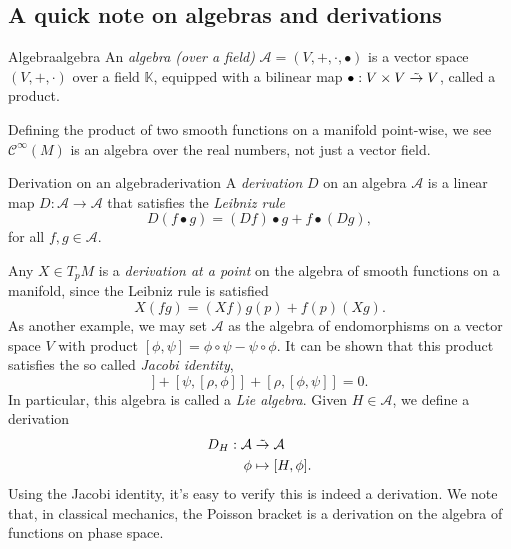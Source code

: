 \subsection{A quick note on algebras and derivations}
\begin{definition}{Algebra}{algebra}
    An \emph{algebra (over a field)} \(\mathcal{A} = (V, +, \cdot, \bullet)\) is a vector space \((V, +, \cdot)\) over a field \(\mathbb{K}\), equipped with a bilinear map \(\bullet : V \times V \mathrel{\tilde{\to}} V\), called a product.
\end{definition}
Defining the product of two smooth functions on a manifold point-wise, we see \(\mathcal{C}^\infty(M)\) is an algebra over the real numbers, not just a vector field.

\begin{definition}{Derivation on an algebra}{derivation}
    A \emph{derivation} \(D\) on an algebra \(\mathcal{A}\) is a linear map \(D : \mathcal{A} \to \mathcal{A}\) that satisfies the \emph{Leibniz rule}
    \begin{equation*}
        D(f\bullet g) = (Df) \bullet g + f \bullet (Dg),
    \end{equation*}
    for all \(f,g \in \mathcal{A}.\)
\end{definition}
Any \(X \in T_pM\) is a \emph{derivation at a point} on the algebra of smooth functions on a manifold, since the Leibniz rule is satisfied
\begin{equation*}
    X(fg) = (Xf)g(p) + f(p)(Xg).
\end{equation*}
As another example, we may set \(\mathcal{A}\) as the algebra of endomorphisms on a vector space \(V\) with product \([\phi, \psi] = \phi \circ \psi - \psi \circ \phi\). It can be shown that this product satisfies the so called \emph{Jacobi identity},
\begin{equation*}
    [\phi, [\psi, \rho]] + [\psi, [\rho, \phi]] + [\rho, [\phi, \psi]] = 0.
\end{equation*}
In particular, this algebra is called a \emph{Lie algebra}. Given \(H \in \mathcal{A}\), we define a derivation
\begin{align*}
    D_H : \mathcal{A} &\mathrel{\tilde{\to}} \mathcal{A}\\
                \phi &\mapsto [H, \phi].
\end{align*}
Using the Jacobi identity, it's easy to verify this is indeed a derivation. We note that, in classical mechanics, the Poisson bracket is a derivation on the algebra of functions on phase space.

